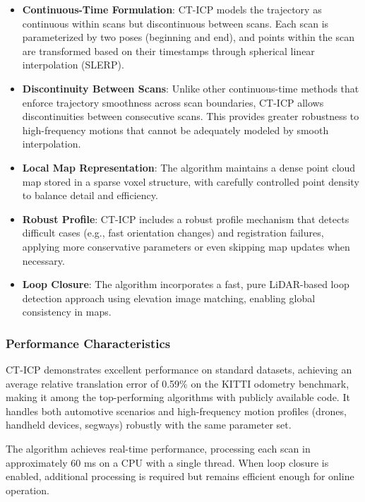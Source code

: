 \documentclass[journal]{IEEEtran}
\begin{document}
\begin{itemize}
    \item \textbf{Continuous-Time Formulation}: CT-ICP models the trajectory as continuous within scans but discontinuous between scans. Each scan is parameterized by two poses (beginning and end), and points within the scan are transformed based on their timestamps through spherical linear interpolation (SLERP).

    \item \textbf{Discontinuity Between Scans}: Unlike other continuous-time methods that enforce trajectory smoothness across scan boundaries, CT-ICP allows discontinuities between consecutive scans. This provides greater robustness to high-frequency motions that cannot be adequately modeled by smooth interpolation.

    \item \textbf{Local Map Representation}: The algorithm maintains a dense point cloud map stored in a sparse voxel structure, with carefully controlled point density to balance detail and efficiency.

    \item \textbf{Robust Profile}: CT-ICP includes a robust profile mechanism that detects difficult cases (e.g., fast orientation changes) and registration failures, applying more conservative parameters or even skipping map updates when necessary.

    \item \textbf{Loop Closure}: The algorithm incorporates a fast, pure LiDAR-based loop detection approach using elevation image matching, enabling global consistency in maps.
\end{itemize}

\subsubsection{Performance Characteristics}

CT-ICP demonstrates excellent performance on standard datasets, achieving an average relative translation error of 0.59\% on the KITTI odometry benchmark, making it among the top-performing algorithms with publicly available code. It handles both automotive scenarios and high-frequency motion profiles (drones, handheld devices, segways) robustly with the same parameter set.

The algorithm achieves real-time performance, processing each scan in approximately 60 ms on a CPU with a single thread. When loop closure is enabled, additional processing is required but remains efficient enough for online operation.
\end{document}
